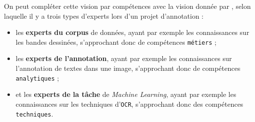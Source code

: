 		\begin{leftBarInformation}
			On peut compléter cette vision par compétences avec la vision donnée par \cite{fort:2017:experts-ou-foule}, selon laquelle il y a trois types d'experts lors d'un projet d'annotation :
			\begin{itemize}
				\item les \textbf{experts du corpus} de données, ayant par exemple les connaissances sur les bandes dessinées, s'approchant donc de compétences \texttt{métiers} ;
				\item les \textbf{experts de l'annotation}, ayant par exemple les connaissances sur l'annotation de textes dans une image, s'approchant donc de compétences \texttt{analytiques} ;
				\item et les \textbf{experts de la tâche} de \textit{Machine Learning}, ayant par exemple les connaissances sur les techniques d'\texttt{OCR}, s'approchant donc des compétences \texttt{techniques}.
			\end{itemize}
		\end{leftBarInformation}
		
